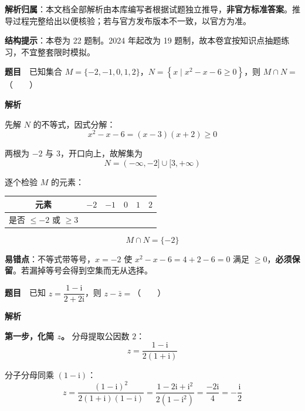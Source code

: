 

\begin{gknotice}
\textbf{解析归属}：本文档全部解析由本库编写者根据试题独立推导，\textbf{非官方标准答案}。推导过程完整给出以便核验；若与官方发布版本不一致，以官方为准。

\textbf{结构提示}：本卷为 22 题制。2024 年起改为 19 题制，故本卷宜按知识点抽题练习，不宜整套限时模拟。
\end{gknotice}

\par\medskip



\textbf{题目}　已知集合 $M=\{-2,-1,0,1,2\}$，$N=\left\{x\mid x^{2}-x-6\ge0\right\}$，则 $M\cap N=$（　　）

\textbf{解析}

先解 $N$ 的不等式，因式分解：
\[x^{2}-x-6=(x-3)(x+2)\ge0\]

两根为 $-2$ 与 $3$，开口向上，故解集为
\[N=(-\infty,-2]\cup[3,+\infty)\]

逐个检验 $M$ 的元素：

\begin{center}
\begin{tabular}{cccccc}
\toprule
元素 & $-2$ & $-1$ & $0$ & $1$ & $2$ \\
\midrule
是否 $\le-2$ 或 $\ge3$ &  &  &  &  &  \\
\bottomrule
\end{tabular}
\end{center}

\[M\cap N=\{-2\}\]


\begin{gktip}
\textbf{易错点}：不等式带等号，$x=-2$ 使 $x^2-x-6=4+2-6=0$ 满足 $\ge0$，\textbf{必须保留}。若漏掉等号会得到空集而无从选择。
\end{gktip}

\par\medskip


\textbf{题目}　已知 $z=\dfrac{1-\mathrm i}{2+2\mathrm i}$，则 $z-\bar z=$（　　）

\textbf{解析}

\textbf{第一步，化简 $z$。} 分母提取公因数 $2$：
\[z=\frac{1-\mathrm i}{2(1+\mathrm i)}\]

分子分母同乘 $(1-\mathrm i)$：
\[z=\frac{(1-\mathrm i)^{2}}{2(1+\mathrm i)(1-\mathrm i)}=\frac{1-2\mathrm i+\mathrm i^{2}}{2\left(1-\mathrm i^{2}\right)}=\frac{-2\mathrm i}{4}=-\frac{\mathrm i}2\]

